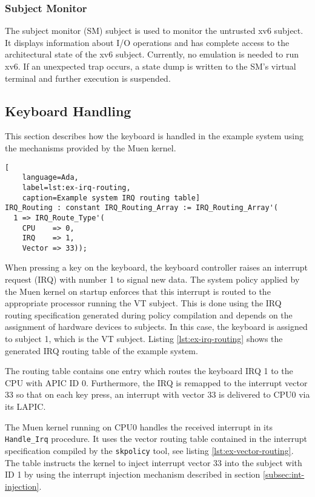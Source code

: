 \subsubsection{Subject Monitor}
The subject monitor (SM) subject is used to monitor the untrusted xv6
subject. It displays information about I/O operations and has complete access to
the architectural state of the xv6 subject. Currently, no emulation is needed to
run xv6. If an unexpected trap occurs, a state dump is written to the SM's
virtual terminal and further execution is suspended.

\subsection{Keyboard Handling}\label{subsec:keyboard-handling}
This section describes how the keyboard is handled in the example system using
the mechanisms provided by the Muen kernel.

\begin{lstlisting}[
	language=Ada,
	label=lst:ex-irq-routing,
	caption=Example system IRQ routing table]
IRQ_Routing : constant IRQ_Routing_Array := IRQ_Routing_Array'(
  1 => IRQ_Route_Type'(
    CPU    => 0,
    IRQ    => 1,
    Vector => 33));
\end{lstlisting}

When pressing a key on the keyboard, the keyboard controller raises an interrupt
request (IRQ) with number 1 to signal new data. The system policy
applied by the Muen kernel on startup enforces that this interrupt is routed to
the appropriate processor running the VT subject. This is done using the IRQ
routing specification generated during policy compilation and depends on the
assignment of hardware devices to subjects. In this case, the keyboard is
assigned to subject 1, which is the VT subject. Listing \ref{lst:ex-irq-routing}
shows the generated IRQ routing table of the example system.

The routing table contains one entry which routes the keyboard IRQ 1 to the CPU
with APIC ID 0. Furthermore, the IRQ is remapped to the interrupt vector 33 so
that on each key press, an interrupt with vector 33 is delivered to CPU0 via its
LAPIC.

The Muen kernel running on CPU0 handles the received interrupt in its
\texttt{Handle\_Irq} procedure. It uses the vector routing table contained in
the interrupt specification compiled by the \texttt{skpolicy} tool, see listing
\ref{lst:ex-vector-routing}. The table instructs the kernel to inject interrupt
vector 33 into the subject with ID 1 by using the interrupt injection mechanism
described in section \ref{subsec:int-injection}.

